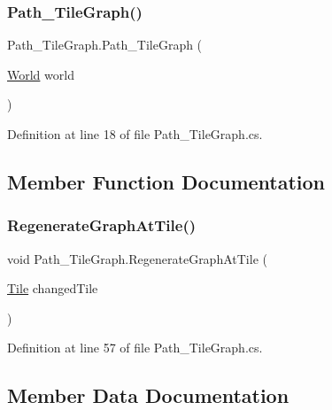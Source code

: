 \subsubsection{\texorpdfstring{Path\+\_\+\+Tile\+Graph()}{Path\_TileGraph()}}
{\footnotesize\ttfamily Path\+\_\+\+Tile\+Graph.\+Path\+\_\+\+Tile\+Graph (\begin{DoxyParamCaption}\item[{\hyperlink{class_world}{World}}]{world }\end{DoxyParamCaption})}



Definition at line 18 of file Path\+\_\+\+Tile\+Graph.\+cs.



\subsection{Member Function Documentation}
\mbox{\label{class_path___tile_graph_a60431b22f15a01b5fd6f43c4be7bf5b0}} 
\subsubsection{\texorpdfstring{Regenerate\+Graph\+At\+Tile()}{RegenerateGraphAtTile()}}
{\footnotesize\ttfamily void Path\+\_\+\+Tile\+Graph.\+Regenerate\+Graph\+At\+Tile (\begin{DoxyParamCaption}\item[{\hyperlink{class_tile}{Tile}}]{changed\+Tile }\end{DoxyParamCaption})}



Definition at line 57 of file Path\+\_\+\+Tile\+Graph.\+cs.



\subsection{Member Data Documentation}
\mbox{\label{class_path___tile_graph_a8bb424d60e5c280b6e7a8ad621ed7728}} 
